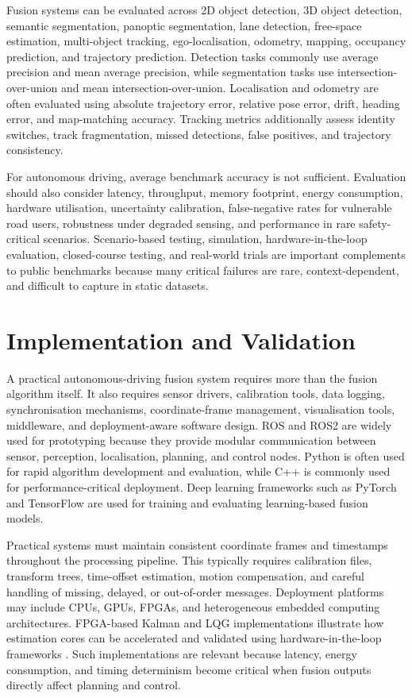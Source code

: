 \documentclass[11pt,oneside,openany]{book}
\begin{document}
Fusion systems can be evaluated across 2D object detection, 3D object detection, semantic segmentation, panoptic segmentation, lane detection, free-space estimation, multi-object tracking, ego-localisation, odometry, mapping, occupancy prediction, and trajectory prediction. Detection tasks commonly use average precision and mean average precision, while segmentation tasks use intersection-over-union and mean intersection-over-union. Localisation and odometry are often evaluated using absolute trajectory error, relative pose error, drift, heading error, and map-matching accuracy. Tracking metrics additionally assess identity switches, track fragmentation, missed detections, false positives, and trajectory consistency.

For autonomous driving, average benchmark accuracy is not sufficient. Evaluation should also consider latency, throughput, memory footprint, energy consumption, hardware utilisation, uncertainty calibration, false-negative rates for vulnerable road users, robustness under degraded sensing, and performance in rare safety-critical scenarios. Scenario-based testing, simulation, hardware-in-the-loop evaluation, closed-course testing, and real-world trials are important complements to public benchmarks because many critical failures are rare, context-dependent, and difficult to capture in static datasets.

\section{Implementation and Validation}

A practical autonomous-driving fusion system requires more than the fusion algorithm itself. It also requires sensor drivers, calibration tools, data logging, synchronisation mechanisms, coordinate-frame management, visualisation tools, middleware, and deployment-aware software design. ROS and ROS2 are widely used for prototyping because they provide modular communication between sensor, perception, localisation, planning, and control nodes. Python is often used for rapid algorithm development and evaluation, while C++ is commonly used for performance-critical deployment. Deep learning frameworks such as PyTorch and TensorFlow are used for training and evaluating learning-based fusion models.

Practical systems must maintain consistent coordinate frames and timestamps throughout the processing pipeline. This typically requires calibration files, transform trees, time-offset estimation, motion compensation, and careful handling of missing, delayed, or out-of-order messages. Deployment platforms may include CPUs, GPUs, FPGAs, and heterogeneous embedded computing architectures. FPGA-based Kalman and LQG implementations illustrate how estimation cores can be accelerated and validated using hardware-in-the-loop frameworks \cite{deliparaschos_fpgabased_2016}. Such implementations are relevant because latency, energy consumption, and timing determinism become critical when fusion outputs directly affect planning and control.
\end{document}
